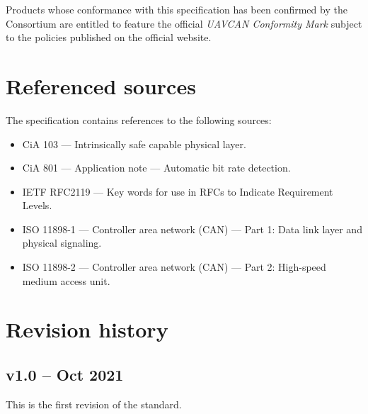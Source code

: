 Products whose conformance with this specification has been confirmed by the Consortium
are entitled to feature the official \emph{UAVCAN Conformity Mark}
subject to the policies published on the official website.

\section{Referenced sources}

The specification contains references to the following sources:

\begin{itemize}
    \item CiA 103 --- Intrinsically safe capable physical layer.
    \item CiA 801 --- Application note --- Automatic bit rate detection.

    \item IETF RFC2119 --- Key words for use in RFCs to Indicate Requirement Levels.

    \item ISO 11898-1 --- Controller area network (CAN) --- Part 1: Data link layer and physical signaling.
    \item ISO 11898-2 --- Controller area network (CAN) --- Part 2: High-speed medium access unit.
\end{itemize}

\section{Revision history}

\subsection{v1.0 -- Oct 2021}

This is the first revision of the standard.
